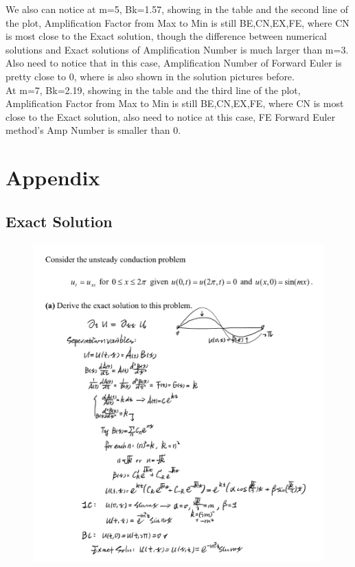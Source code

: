 \documentclass[12pt]{article}
\begin{document}
We also can notice at m=5, Bk=1.57, showing in the table and the second line of the plot, Amplification Factor from Max to Min is still  BE,CN,EX,FE, where CN is most close to the Exact solution, though the difference between numerical solutions and Exact solutions of Amplification Number is much larger than m=3. Also need to notice that in this case, Amplification Number of Forward Euler is pretty close to 0, where is also shown in the solution pictures before.\\




At m=7, Bk=2.19, showing in the table and the third line of the plot, Amplification Factor from Max to Min is still BE,CN,EX,FE, where CN is most close to the Exact solution, also need to notice at this case, FE Forward Euler method’s Amp Number is smaller than 0.



\section{Appendix}
\subsection{Exact Solution}


\begin{figure}[H] 
\centering 
\includegraphics[scale=0.4]{exact solution.jpg} 
\label{TDMA Solver code} 
\end{figure}
\end{document}
